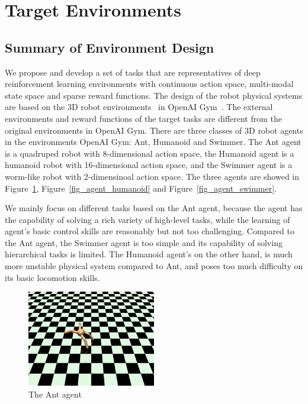 \section{Target Environments}\label{sec_env}
\subsection{Summary of Environment Design}
We propose and develop a set of tasks that are representatives of deep reinforcement learning environments with continuous action space, multi-modal state space and sparse reward functions. The design of the robot physical systems are based on the 3D robot environments~\cite{roboschool_2018} in OpenAI Gym~\cite{openaigym}. The external environments and reward functions of the target tasks are different from the original environments in OpenAI Gym. There are three classes of 3D robot agents in the environments OpenAI Gym: Ant, Humanoid and Swimmer. The Ant agent is a quadruped robot with 8-dimensional action space, the Humanoid agent is a humanoid robot with 16-dimensional action space, and the Swimmer agent is a worm-like robot with 2-dimensinoal action space.  The three agents are showed in Figure~\ref{fig_agent_ant}, Figure~\ref{fig_agent_humanoid} and Figure~\ref{fig_agent_swimmer}.

We mainly focus on different tasks based on the Ant agent, because the agent has the capability of solving a rich variety of high-level tasks, while the learning of agent's basic control skills are reasonably but not too challenging. 
Compared to the Ant agent, the Swimmer agent is too simple and its capability of solving hierarchical tasks is limited. The Humanoid agent's on the other hand, is much more unstable physical system compared to Ant, and poses too much difficulty on its basic locomotion skills.
\begin{figure}[H]
	\includegraphics[width=0.5\textwidth]{images/agent_ant.png}
	\centering
	\caption{The Ant agent}\label{fig_agent_ant}
\end{figure}

